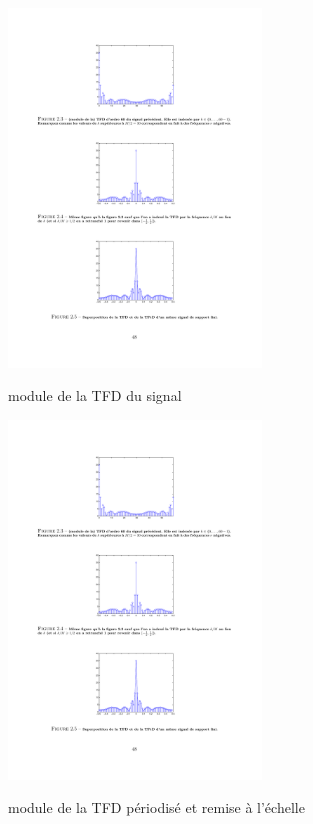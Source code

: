 \begin{definition}
\begin{figure}
  \centering
  \includegraphics[width=0.6\textwidth]{Figures/Figure2-3}\\
  \caption{module de la TFD du signal}\label{fig:figure2-3}
\end{figure}

\begin{figure}
  \centering
  \includegraphics[width=0.6\textwidth]{Figures/Figure2-4}\\
  \caption{module de la TFD p\'eriodis\'e et remise \`a l'\'echelle}\label{fig:figure2-4}
\end{figure}


\end{definition}

